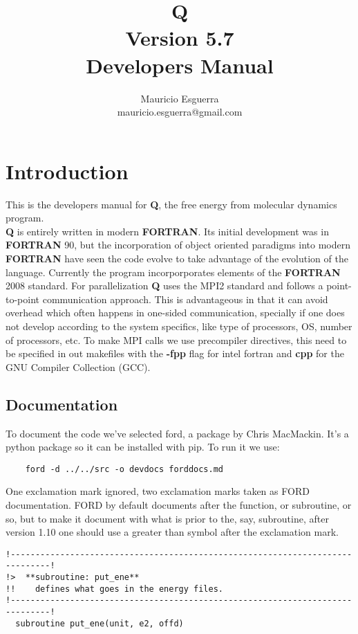 \documentclass[10pt, oneside, pdftex]{article}
\title{Q\\
    \LARGE Version 5.7 \\
    \LARGE \vspace*{-10pt}Developers Manual\vspace*{10pt}}
\author{
  \vspace{10pt}
  Mauricio Esguerra \\
  \vspace{4pt}
  mauricio.esguerra@gmail.com \\
  \vspace{20pt}
  }
\makeatletter
\def\printtitle{
{\color{bl} \centering \Huge \textbf{\@title}\par}} %
\def\printauthor{                        %
{\centering \small \@author}}            %
\makeatother
\begin{document}
\printtitle
\printauthor
\tableofcontents
%

\vspace{20pt}
\section{Introduction}
This is  the developers  manual for \textbf{Q},  the free  energy from
molecular dynamics program.\\
\noindent \textbf{Q}  is entirely written in  modern \textbf{FORTRAN}.
Its  initial   development  was   in  \textbf{FORTRAN}  90,   but  the
incorporation    of   object    oriented    paradigms   into    modern
\textbf{FORTRAN} have  seen the code  evolve to take advantage  of the
evolution  of the  language.   Currently  the program  incorporporates
elements of  the \textbf{FORTRAN}  2008 standard.  For parallelization
\textbf{Q}  uses  the  MPI2  standard  and  follows  a  point-to-point
communication  approach. This  is advantageous  in that  it can  avoid
overhead which often happens  in one-sided communication, specially if
one does not  develop according to the system specifics,  like type of
processors, OS, number of processors, etc.
To make MPI calls we use precompiler directives, this need to be
specified in out makefiles with the \textbf{-fpp} flag for intel
fortran and \textbf{cpp} for the GNU Compiler Collection (GCC).


\subsection{Documentation}
\label{documentation}
To document the code we've selected ford, a package by Chris
MacMackin. It's a python package so it can be installed with pip.
To run it we use:
\begin{Verbatim}
    ford -d ../../src -o devdocs forddocs.md
\end{Verbatim}

One exclamation mark ignored, two exclamation marks taken as FORD
documentation.
FORD by default documents after the function, or subroutine, or so, but
to make it document with what is prior to the, say, subroutine, after
version 1.10 one should use a greater than symbol after the
exclamation mark.

\begin{Verbatim}
!------------------------------------------------------------------------------!
!>  **subroutine: put_ene**
!!    defines what goes in the energy files.
!------------------------------------------------------------------------------!
  subroutine put_ene(unit, e2, offd)
\end{Verbatim}
  
\end{document}
